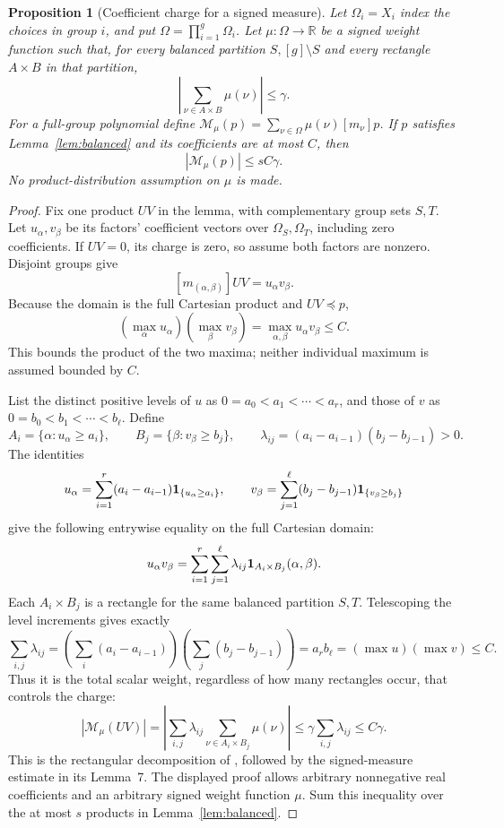 \documentclass[11pt]{article}
\newtheorem{proposition}[theorem]{Proposition}
\theoremstyle{definition}
\theoremstyle{remark}
\numberwithin{equation}{section}
\begin{document}
\begin{proposition}[Coefficient charge for a signed measure]\label{prop:charge}
Let \(\Omega_i=X_i\) index the choices in group \(i\), and put
\(\Omega=\prod_{i=1}^g\Omega_i\). Let \(\mu:\Omega\to\mathbb R\)
be a signed weight function such that, for every balanced partition
\(S,[g]\setminus S\) and every rectangle \(A\times B\) in that
partition,
\[
 \left|\sum_{\nu\in A\times B}\mu(\nu)\right|\le\gamma.
\]
For a full-group polynomial define
\(\mathcal M_\mu(p)=\sum_{\nu\in\Omega}\mu(\nu)[m_\nu]p\).
If \(p\) satisfies Lemma~\ref{lem:balanced} and its coefficients
are at most \(C\), then
\[
 |\mathcal M_\mu(p)|\le sC\gamma.
\]
No product-distribution assumption on \(\mu\) is made.
\end{proposition}

\begin{proof}
Fix one product \(UV\) in the lemma, with complementary group
sets \(S,T\). Let \(u_\alpha,v_\beta\) be its factors' coefficient
vectors over \(\Omega_S,\Omega_T\), including zero coefficients.
If \(UV=0\), its charge is zero, so assume both factors are nonzero.
Disjoint groups give
\[
 [m_{(\alpha,\beta)}]UV=u_\alpha v_\beta.
\]
Because the domain is the full Cartesian product and \(UV\preceq p\),
\[
 \left(\max_\alpha u_\alpha\right)
 \left(\max_\beta v_\beta\right)
 =\max_{\alpha,\beta}u_\alpha v_\beta\le C.
\]
This bounds the product of the two maxima; neither individual
maximum is assumed bounded by \(C\).

List the distinct positive levels of \(u\) as
\(0=a_0<a_1<\cdots<a_r\), and those of \(v\) as
\(0=b_0<b_1<\cdots<b_\ell\). Define
\[
 A_i=\{\alpha:u_\alpha\ge a_i\},\qquad
 B_j=\{\beta:v_\beta\ge b_j\},\qquad
 \lambda_{ij}=(a_i-a_{i-1})(b_j-b_{j-1})>0.
\]
The identities
\[
 u_\alpha=\sum_{i=1}^r(a_i-a_{i-1})
                  {\bf1}_{\{u_\alpha\ge a_i\}},\qquad
 v_\beta=\sum_{j=1}^\ell(b_j-b_{j-1})
                  {\bf1}_{\{v_\beta\ge b_j\}}
\]
give the following entrywise equality on the full Cartesian domain:
\[
 u_\alpha v_\beta
 =\sum_{i=1}^r\sum_{j=1}^\ell
       \lambda_{ij}{\bf1}_{A_i\times B_j}(\alpha,\beta).
\]
Each \(A_i\times B_j\) is a rectangle for the same balanced
partition \(S,T\). Telescoping the level increments gives exactly
\[
 \sum_{i,j}\lambda_{ij}
 =\left(\sum_i(a_i-a_{i-1})\right)
  \left(\sum_j(b_j-b_{j-1})\right)
 =a_rb_\ell=(\max u)(\max v)\le C.
\]
Thus it is the total scalar weight, regardless of how many
rectangles occur, that controls the charge:
\[
 |\mathcal M_\mu(UV)|
 =\left|\sum_{i,j}\lambda_{ij}
                  \sum_{\nu\in A_i\times B_j}\mu(\nu)\right|
 \le\gamma\sum_{i,j}\lambda_{ij}\le C\gamma.
\]
This is the rectangular decomposition of
\cite[Lemma~9, pp.~39:10--39:11]{CDGM2022}, followed by the
signed-measure estimate in its Lemma~7. The displayed proof
allows arbitrary nonnegative real coefficients and an arbitrary
signed weight function \(\mu\).
Sum this inequality over the at most \(s\) products in
Lemma~\ref{lem:balanced}.
\end{proof}
\end{document}
